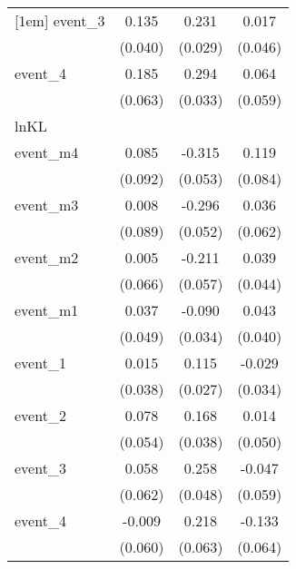 {\begin{tabular}{l*{3}{c}}
[1em]
event\_3     &       0.135\sym{***}&       0.231\sym{***}&       0.017         \\
            &     (0.040)         &     (0.029)         &     (0.046)         \\
[1em]
event\_4     &       0.185\sym{**} &       0.294\sym{***}&       0.064         \\
            &     (0.063)         &     (0.033)         &     (0.059)         \\
\hline
lnKL        &                     &                     &                     \\
event\_m4    &       0.085         &      -0.315\sym{***}&       0.119         \\
            &     (0.092)         &     (0.053)         &     (0.084)         \\
[1em]
event\_m3    &       0.008         &      -0.296\sym{***}&       0.036         \\
            &     (0.089)         &     (0.052)         &     (0.062)         \\
[1em]
event\_m2    &       0.005         &      -0.211\sym{***}&       0.039         \\
            &     (0.066)         &     (0.057)         &     (0.044)         \\
[1em]
event\_m1    &       0.037         &      -0.090\sym{**} &       0.043         \\
            &     (0.049)         &     (0.034)         &     (0.040)         \\
[1em]
event\_1     &       0.015         &       0.115\sym{***}&      -0.029         \\
            &     (0.038)         &     (0.027)         &     (0.034)         \\
[1em]
event\_2     &       0.078         &       0.168\sym{***}&       0.014         \\
            &     (0.054)         &     (0.038)         &     (0.050)         \\
[1em]
event\_3     &       0.058         &       0.258\sym{***}&      -0.047         \\
            &     (0.062)         &     (0.048)         &     (0.059)         \\
[1em]
event\_4     &      -0.009         &       0.218\sym{***}&      -0.133\sym{*}  \\
            &     (0.060)         &     (0.063)         &     (0.064)         \\

\end{tabular}}
